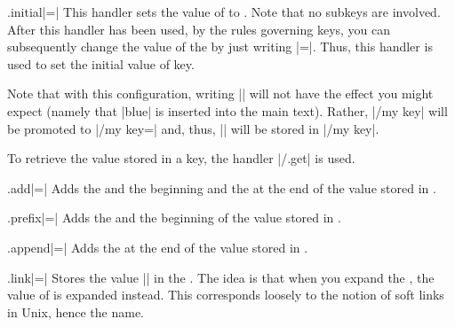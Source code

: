 \begin{handler}{{.initial}|=|}
    This handler sets the value of  to . Note that no
    subkeys are involved. After this handler has been used, by the rules
    governing keys, you can subsequently change the value of the  by
    just writing |=|. Thus, this handler is used to set
    the initial value of key.
\begin{codeexample}
\end{codeexample}

    Note that with this configuration, writing || will not
    have the effect you might expect (namely that |blue| is inserted into the
    main text). Rather, |/my key| will be promoted to |/my key=\pgfkeysnovalue|
    and, thus, |\pgfkeysnovalue| will be stored in |/my key|.

    To retrieve the value stored in a key, the handler |/.get| is used.
\end{handler}


\begin{handler}{{.add}|=|}
    Adds the  and the beginning and the 
    at the end of the value stored in .
\end{handler}

\begin{handler}{{.prefix}|=|}
    Adds the  and the beginning of the value stored in
    .
\end{handler}

\begin{handler}{{.append}|=|}
    Adds the  at the end of the value stored in .
\end{handler}

\begin{handler}{{.link}|=|}
    Stores the value || in the .
    The idea is that when you expand the , the value of  is expanded instead. This corresponds loosely to the notion of soft
    links in Unix, hence the name.
\end{handler}

